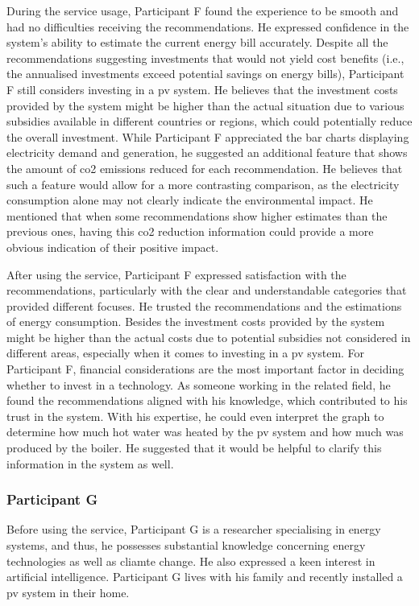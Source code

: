 During the service usage, 
Participant F found the experience to be smooth and had no difficulties receiving the recommendations. 
He expressed confidence in the system's ability to estimate the current energy bill accurately. 
Despite all the recommendations suggesting investments that would not yield cost benefits (i.e., the annualised investments exceed potential savings on energy bills), 
Participant F still considers investing in a \gls{pv} system. 
He believes that the investment costs provided by the system might be higher than the actual situation due to various subsidies available in different countries or regions, which could potentially reduce the overall investment.
While Participant F appreciated the bar charts displaying electricity demand and generation, 
he suggested an additional feature that shows the amount of \gls{co2} emissions reduced for each recommendation. 
He believes that such a feature would allow for a more contrasting comparison, 
as the electricity consumption alone may not clearly indicate the environmental impact. 
He mentioned that when some recommendations show higher estimates than the previous ones, 
having this \gls{co2} reduction information could provide a more obvious indication of their positive impact.

After using the service, 
Participant F expressed satisfaction with the recommendations, particularly with the clear and understandable categories that provided different focuses. 
He trusted the recommendations and the estimations of energy consumption. 
Besides the investment costs provided by the system might be higher than the actual costs due to potential subsidies not considered in different areas, 
especially when it comes to investing in a \gls{pv} system.
For Participant F, financial considerations are the most important factor in deciding whether to invest in a technology. 
As someone working in the related field, he found the recommendations aligned with his knowledge, which contributed to his trust in the system. 
With his expertise, he could even interpret the graph to determine how much hot water was heated by the \gls{pv} system and how much was produced by the boiler. 
He suggested that it would be helpful to clarify this information in the system as well. 


\subsubsection{Participant G}

Before using the service, 
Participant G is a researcher specialising in energy systems, 
and thus, he possesses substantial knowledge concerning energy technologies as well as cliamte change. 
He also expressed a keen interest in artificial intelligence. 
Participant G lives with his family and recently installed a \gls{pv} system in their home.

